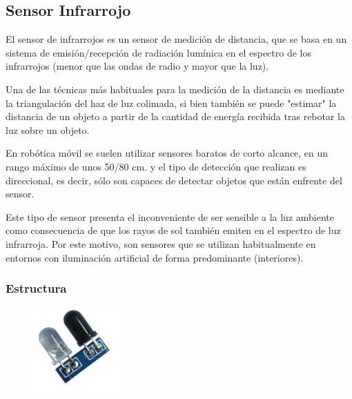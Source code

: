 \documentclass[12pt, fleqn]{article}                            %
\theoremstyle{break}                                            %
\begin{document}
    \vspace{1em}
    \subsection{Sensor Infrarrojo}

        El sensor de infrarrojos es un sensor de medición de distancia, que se basa en un
        sistema de emisión/recepción de radiación lumínica en el espectro de los infrarrojos
        (menor que las ondas de radio y mayor que la luz).

        Una de las técnicas más habituales para la medición de la distancia es mediante la
        triangulación del haz de luz colimada, si bien también se puede "estimar" la distancia
        de un objeto a partir de la cantidad de energía recibida tras rebotar la luz sobre un objeto.

        En robótica móvil se suelen utilizar sensores baratos de corto alcance, en un rango máximo
        de unos 50/80 cm. y el tipo de detección que realizan es direccional, es decir, sólo son
        capaces de detectar objetos que están enfrente del sensor.

        Este tipo de sensor presenta el inconveniente de ser sensible a la luz ambiente como
        consecuencia de que los rayos de sol también emiten en el espectro de luz infrarroja.
        Por este motivo, son sensores que se utilizan habitualmente en entornos con iluminación
        artificial de forma predominante (interiores).

        \subsubsection{Estructura}

            \begin{figure}
                \centering
                \includegraphics[width=0.30\textwidth]{SensorInfrarrojo}
            \end{figure}
\end{document}
